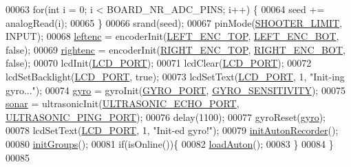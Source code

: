 \begin{DoxyCode}
00063     \textcolor{keywordflow}{for}(\textcolor{keywordtype}{int} i = 0; i < BOARD\_NR\_ADC\_PINS; i++) \{
00064         seed += analogRead(i);
00065     \}
00066     srand(seed);
00067     pinMode(\hyperlink{sensors_8h_a354b5ed50c08708ba703ca9e9121a0cf}{SHOOTER\_LIMIT}, INPUT);
00068     \hyperlink{sensors_8c_a48ead63071a2b65b87a166928a5a5c08}{leftenc} = encoderInit(\hyperlink{sensors_8h_ad0ae0aded49835e75c52bc506585f5a6}{LEFT\_ENC\_TOP}, \hyperlink{sensors_8h_ae913e0b80ef027d0a619e59a3d2ffb85}{LEFT\_ENC\_BOT}, \textcolor{keyword}{false});
00069     \hyperlink{sensors_8c_a8c853ba918673c4878ab6935c54969e4}{rightenc} = encoderInit(\hyperlink{sensors_8h_a07c1c0ceab9fee6088955b2b2706e515}{RIGHT\_ENC\_TOP}, \hyperlink{sensors_8h_a76290ef36d8c093e1d380e26d1d01f6a}{RIGHT\_ENC\_BOT}, \textcolor{keyword}{false});
00070     lcdInit(\hyperlink{lcdmsg_8h_abcf42bd88b3c36193f301ca25b033875}{LCD\_PORT});
00071     lcdClear(\hyperlink{lcdmsg_8h_abcf42bd88b3c36193f301ca25b033875}{LCD\_PORT});
00072     lcdSetBacklight(\hyperlink{lcdmsg_8h_abcf42bd88b3c36193f301ca25b033875}{LCD\_PORT}, \textcolor{keyword}{true});
00073     lcdSetText(\hyperlink{lcdmsg_8h_abcf42bd88b3c36193f301ca25b033875}{LCD\_PORT}, 1, \textcolor{stringliteral}{"Init-ing gyro..."});
00074     \hyperlink{sensors_8c_ad2d059cd4baeedd5fbead13085953eed}{gyro} = gyroInit(\hyperlink{sensors_8h_a51d281e7676749d34aab3f8ba6fab960}{GYRO\_PORT}, \hyperlink{sensors_8h_a6e58fcea626847c9734cdc19eb93a6c5}{GYRO\_SENSITIVITY});
00075     \hyperlink{sensors_8c_a09e334aba0637f228c65c135f428606a}{sonar} = ultrasonicInit(\hyperlink{sensors_8h_ac6e827f0a9c2f52b4d935274daad778a}{ULTRASONIC\_ECHO\_PORT}, 
      \hyperlink{sensors_8h_a97be84893513dc7afb5c4c26b7bdd074}{ULTRASONIC\_PING\_PORT});
00076     delay(1100);
00077     gyroReset(\hyperlink{sensors_8c_ad2d059cd4baeedd5fbead13085953eed}{gyro});
00078     lcdSetText(\hyperlink{lcdmsg_8h_abcf42bd88b3c36193f301ca25b033875}{LCD\_PORT}, 1, \textcolor{stringliteral}{"Init-ed gyro!"});
00079     \hyperlink{autonrecorder_8c_acd89c8b2c622ae271c5d63d7fb8fa5f6}{initAutonRecorder}();
00080     \hyperlink{lcddiag_8c_ad290df3e273598f9f10fe34c257e4084}{initGroups}();
00081     \textcolor{keywordflow}{if}(isOnline())\{
00082         \hyperlink{autonrecorder_8c_af6d130061f44459f9b3c629123e78f6e}{loadAuton}();
00083     \}
00084 \}
00085 
\end{DoxyCode}
